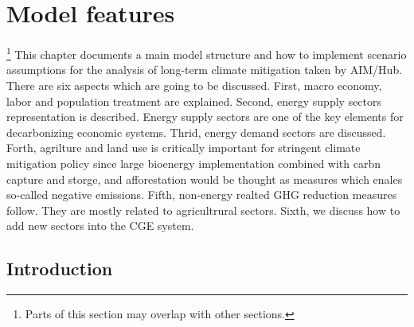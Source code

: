 \documentclass[10pt,a4paper,titlepage,dvipdfmx]{book}
\begin{document}
\chapter{\label{chp:ModFea}{Model features}}
\footnote{Parts of this section may overlap with other sections.}\label{mark-11.}
This chapter documents a main model structure and how to implement scenario assumptions for the analysis of long-term climate mitigation taken by AIM/Hub. 
There are six aspects which are going to be discussed. First, macro economy, labor and population treatment are explained. Second, energy supply sectors representation is described. 
Energy supply sectors are one of the key elements for decarbonizing economic systems. 
Thrid, energy demand sectors are discussed. 
Forth, agrilture and land use is critically important for stringent climate mitigation policy since large bioenergy implementation combined with carbn capture and storge, and afforestation would be thought as measures which enales so-called negative emissions. 
Fifth, non-energy realted GHG reduction measures follow. They are mostly related to agricultrural sectors. 
Sixth, we discuss how to add new sectors into the CGE system.

\section{\label{sec:SomTIPS-Int}{Introduction}}
\end{document}
